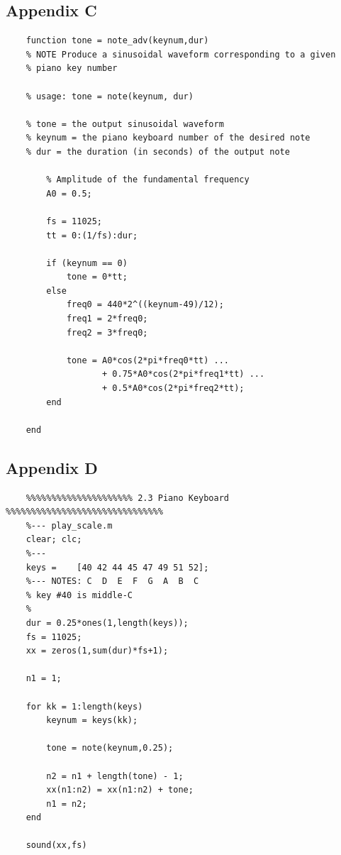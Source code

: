 \documentclass{article}
\begin{document}
\newpage

\subsection{Appendix C}

\begin{lstlisting}
	function tone = note_adv(keynum,dur)
	% NOTE Produce a sinusoidal waveform corresponding to a given
	% piano key number
	
	% usage: tone = note(keynum, dur)
	
	% tone = the output sinusoidal waveform 
	% keynum = the piano keyboard number of the desired note
	% dur = the duration (in seconds) of the output note
	    
	    % Amplitude of the fundamental frequency
	    A0 = 0.5;
	    
	    fs = 11025;
	    tt = 0:(1/fs):dur;
	    
	    if (keynum == 0)
	        tone = 0*tt;
	    else
	        freq0 = 440*2^((keynum-49)/12);
	        freq1 = 2*freq0;
	        freq2 = 3*freq0;
	        
	        tone = A0*cos(2*pi*freq0*tt) ...
	               + 0.75*A0*cos(2*pi*freq1*tt) ...
	               + 0.5*A0*cos(2*pi*freq2*tt);
	    end
	    
	end
\end{lstlisting}

\newpage

\subsection{Appendix D}

\begin{lstlisting}
	%%%%%%%%%%%%%%%%%%%%% 2.3 Piano Keyboard %%%%%%%%%%%%%%%%%%%%%%%%%%%%%%%
	%--- play_scale.m
	clear; clc;
	%---
	keys =    [40 42 44 45 47 49 51 52];
	%--- NOTES: C  D  E  F  G  A  B  C
	% key #40 is middle-C
	%
	dur = 0.25*ones(1,length(keys));
	fs = 11025;
	xx = zeros(1,sum(dur)*fs+1);
	
	n1 = 1;
	
	for kk = 1:length(keys)
	    keynum = keys(kk);
	    
	    tone = note(keynum,0.25);
	    
	    n2 = n1 + length(tone) - 1;
	    xx(n1:n2) = xx(n1:n2) + tone;
	    n1 = n2;
	end
	
	sound(xx,fs)
\end{lstlisting}

\newpage
\end{document}

